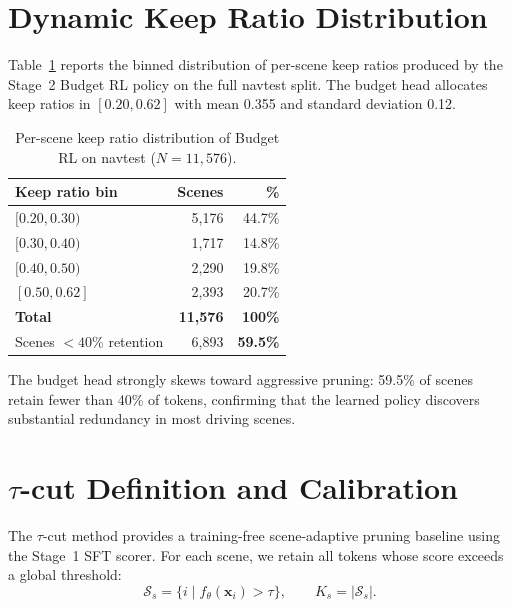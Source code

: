 \documentclass[letterpaper]{article}
\begin{document}
\section{Dynamic Keep Ratio Distribution}
\label{sec:distribution}

Table~\ref{tab:binned} reports the binned distribution of per-scene keep ratios produced by the
Stage~2 Budget RL policy on the full navtest split. The budget head allocates keep ratios in
$[0.20, 0.62]$ with mean 0.355 and standard deviation 0.12.

\begin{table}[h]
\centering
\caption{Per-scene keep ratio distribution of Budget RL on navtest ($N{=}11{,}576$).}
\label{tab:binned}
\begin{tabular}{@{}lrr@{}}
\toprule
Keep ratio bin & Scenes & \% \\
\midrule
$[0.20, 0.30)$ & 5{,}176 & 44.7\% \\
$[0.30, 0.40)$ & 1{,}717 & 14.8\% \\
$[0.40, 0.50)$ & 2{,}290 & 19.8\% \\
$[0.50, 0.62]$ & 2{,}393 & 20.7\% \\
\midrule
\textbf{Total} & \textbf{11{,}576} & \textbf{100\%} \\
\midrule
Scenes $<40\%$ retention & 6{,}893 & \textbf{59.5\%} \\
\bottomrule
\end{tabular}
\end{table}

The budget head strongly skews toward aggressive pruning: 59.5\% of scenes retain fewer than 40\%
of tokens, confirming that the learned policy discovers substantial redundancy in most driving
scenes.

\section{$\tau$-cut Definition and Calibration}
\label{sec:taucut}

The $\tau$-cut method provides a training-free scene-adaptive pruning baseline using the Stage~1
SFT scorer. For each scene, we retain all tokens whose score exceeds a global threshold:
\begin{equation}
\mathcal{S}_s = \{i \mid f_\theta(\mathbf{x}_i) > \tau\},
\qquad K_s = |\mathcal{S}_s|.
\end{equation}
\end{document}
